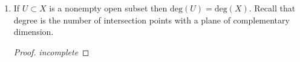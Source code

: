\documentclass[12pt]{article}
\theoremstyle{definition}
\newenvironment{problem}[2][Problem]{\begin{trivlist}
\item[\hskip \labelsep {\bfseries #1}\hskip \labelsep {\bfseries #2.}]}{\end{trivlist}}
\begin{document}
\begin{problem}{6}
\begin{enumerate}[label=(\alph*)]
\begin{proof}
			\end{proof}
		\item If $U \subset X$ is a nonempty open subset then $\text{deg}(U) = \text{deg}(X)$. Recall that degree is the number of intersection points with a plane of complementary dimension.
			 \begin{proof}
				 \textit{incomplete}
			 \end{proof}
	\end{enumerate}
\end{problem}
\maketitle
\end{document}
